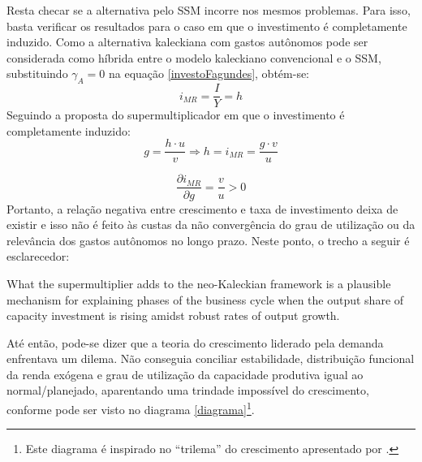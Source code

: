 Resta checar se a alternativa pelo SSM incorre nos mesmos problemas. Para isso, basta verificar os resultados para o caso em que o investimento é completamente induzido. Como a alternativa kaleckiana com gastos autônomos pode ser considerada como híbrida entre o modelo kaleckiano convencional e o SSM, substituindo $\gamma_A = 0$ na equação \ref{investoFagundes}, obtém-se:
$$
i_{MR} = \frac{I}{Y} =  h
$$
Seguindo a proposta do supermultiplicador em que o investimento é completamente induzido:
$$
g = \frac{h\cdot u}{v} \Rightarrow h = i_{MR} = \frac{g\cdot v}{u}
$$

$$
\frac{\partial i_{MR}}{\partial g} = \frac{v}{u} > 0
$$
Portanto, a relação negativa entre crescimento e taxa de investimento deixa de existir e isso não é feito às custas da não convergência do grau de utilização ou da relevância dos gastos autônomos no longo prazo. Neste ponto, o trecho a seguir é esclarecedor:

\begin{citacao}
 What the supermultiplier adds to the neo-Kaleckian framework is a plausible mechanism for explaining phases
of the business cycle when the output share of capacity investment is rising amidst robust rates of output growth. \cite[p.~9]{fiebiger_trend_2017}
\end{citacao}
Até então, pode-se dizer que a teoria do crescimento liderado pela demanda enfrentava um dilema. Não conseguia conciliar estabilidade, distribuição funcional da renda exógena e grau de utilização da capacidade produtiva igual ao normal/planejado, aparentando uma trindade impossível do crescimento, conforme pode ser visto no diagrama \ref{diagrama}\footnote{Este diagrama é inspirado no ``trilema'' do crescimento apresentado por \textcite{cesaratto_neo-kaleckian_2015}.}.


